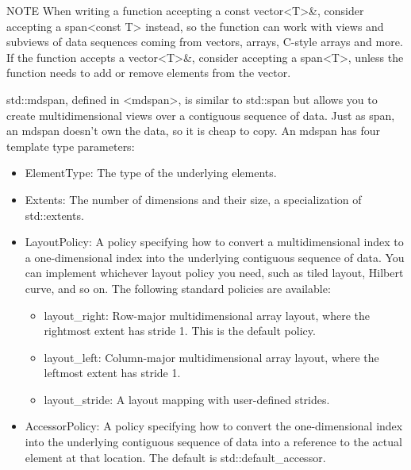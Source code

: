 \begin{myNotic}{NOTE}
When writing a function accepting a const vector<T>\&, consider accepting a span<const T> instead, so the function can work with views and subviews of data sequences coming from vectors, arrays, C-style arrays and more. If the function accepts a vector<T>\&, consider accepting a span<T>, unless the function needs to add or remove elements from the vector.
\end{myNotic}



std::mdspan, defined in <mdspan>, is similar to std::span but allows you to create multidimensional views over a contiguous sequence of data. Just as span, an mdspan doesn’t own the data, so it is cheap to copy. An mdspan has four template type parameters:

\begin{itemize}
\item
ElementType: The type of the underlying elements.

\item
Extents: The number of dimensions and their size, a specialization of std::extents.

\item
LayoutPolicy: A policy specifying how to convert a multidimensional index to a one-dimensional index into the underlying contiguous sequence of data. You can implement whichever layout policy you need, such as tiled layout, Hilbert curve, and so on. The following standard policies are available:
\begin{itemize}
\item
layout\_right: Row-major multidimensional array layout, where the rightmost extent has stride 1. This is the default policy.

\item
layout\_left: Column-major multidimensional array layout, where the leftmost extent has stride 1.

\item
layout\_stride: A layout mapping with user-defined strides.
\end{itemize}

\item
AccessorPolicy: A policy specifying how to convert the one-dimensional index into the underlying contiguous sequence of data into a reference to the actual element at that location. The default is std::default\_accessor.
\end{itemize}

